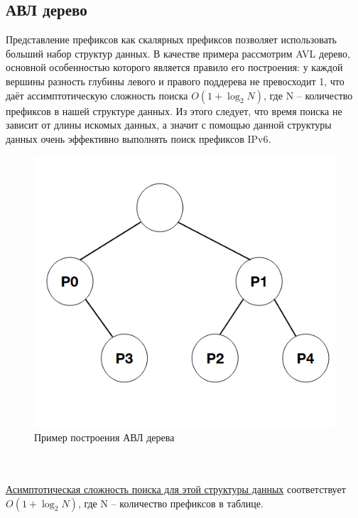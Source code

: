 \documentclass[a4peper, 12pt, titlepage, finall]{report}
\begin{document}
        \subsection{АВЛ дерево}
            Представление префиксов как скалярных префиксов позволяет использовать больший набор структур данных. 
            В качестве примера рассмотрим AVL дерево, основной особенностью которого является правило его построения: у каждой вершины разность 
            глубины левого и правого поддерева не превосходит 1, что даёт ассимптотическую сложность поиска {\ttfamily $O(1+\log_2{N})$}, 
            где {\ttfamily N} -- количество префиксов в нашей структуре данных. Из этого следует, что время поиска не зависит от длины искомых данных,
            а значит с помощью данной структуры данных очень эффективно выполнять поиск префиксов IPv6.
            \\
            \begin{figure}[h]
                \includegraphics[width=\textwidth]{AVL-tree.png}
                \caption{Пример построения АВЛ дерева}
                \label{fig:mesh5}
            \end{figure}
            \\
            \\
            \underline{Асимптотическая сложность поиска для этой структуры данных} соответствует {\ttfamily $O(1 + \log_2{N})$},
            где {\ttfamily N} -- количество префиксов в таблице.\\
\end{document}
